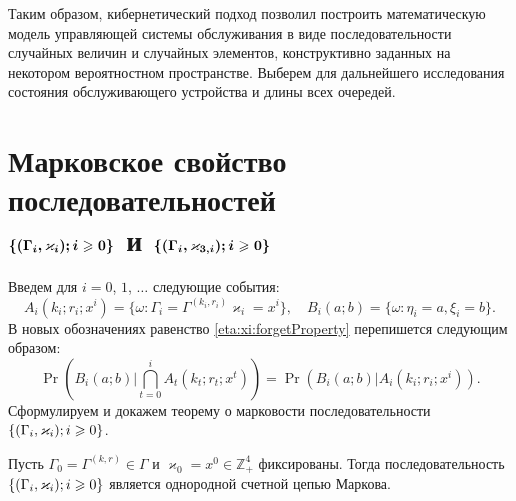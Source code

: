 \documentclass[a4paper,12pt,russian]{extarticle}
\newcommand{\Mark}{\{(\Gamma_i, \varkappa_i); \hm{} i \geqslant 0\}}
\newcommand{\MarkThree}{\{(\Gamma_i, \varkappa_{3,i}); \hm{} i \geqslant 0\}}
\begin{document}
Таким образом, кибернетический подход позволил построить математическую модель управляющей системы обслуживания в виде последовательности случайных величин и случайных элементов, конструктивно заданных на некотором вероятностном пространстве. Выберем для дальнейшего исследования состояния обслуживающего устройства и длины всех очередей.

\section[Марковское свойство последовательностей $\boldsymbol{\Mark}$ и $\boldsymbol{\MarkThree}$]%
{Марковское свойство последовательностей \\ $\boldsymbol{\Mark}$ и $\boldsymbol{\MarkThree}$}

Введем для $i=0$, $1$, $\ldots$ следующие события:
\begin{equation*}
A_i(k_i;r_i;x^i) = \{\omega\colon\Gamma_i=\Gamma^{(k_i,r_i)}\varkappa_i=x^i\}, \quad  B_i(a;b) = \{\omega\colon\eta_i=a, \xi_i=b\}.
\end{equation*}
В новых обозначениях равенство \eqref{eta:xi:forgetProperty}  перепишется следующим образом:
\begin{equation}
\Pr (B_i(a;b) | \bigcap_{t=0}^{i} A_t(k_t;r_t;x^t)) = \Pr (B_i(a;b) |  A_i(k_i;r_i;x^i)).
\label{new:notation:eta:xi:forget}
\end{equation}
Сформулируем и докажем теорему о марковости последовательности $\Mark$.
\begin{theorem}
Пусть $\Gamma_0=\Gamma^{(k,r)}\in \Gamma$ и $\varkappa_0=x^0\in \mathbb{Z}_+^4$ фиксированы. Тогда последовательность $\Mark$ является однородной счетной цепью Маркова. 
\end{theorem}
\end{document}
